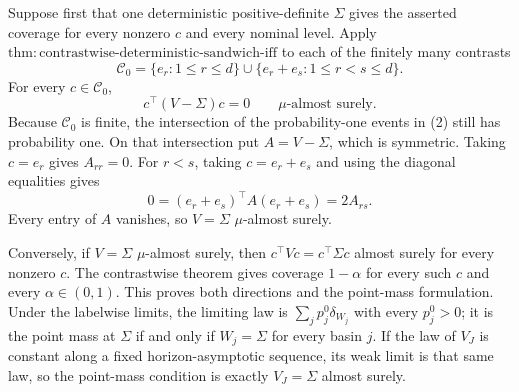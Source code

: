 Suppose first that one deterministic positive-definite \(\Sigma\) gives the asserted coverage for every nonzero \(c\) and every nominal level. Apply \(\mathrm{thm:contrastwise\text{-}deterministic\text{-}sandwich\text{-}iff}\) to each of the finitely many contrasts
\[
 \mathcal C_0=\{e_r:1\le r\le d\}\cup
 \{e_r+e_s:1\le r<s\le d\}.
\tag{1}
\]
For every \(c\in\mathcal C_0\),
\[
 c^\top(V-\Sigma)c=0\qquad\mu\text{-almost surely}.
\tag{2}
\]
Because \(\mathcal C_0\) is finite, the intersection of the probability-one events in (2) still has probability one. On that intersection put \(A=V-\Sigma\), which is symmetric. Taking \(c=e_r\) gives \(A_{rr}=0\). For \(r<s\), taking \(c=e_r+e_s\) and using the diagonal equalities gives
\[
 0=(e_r+e_s)^\top A(e_r+e_s)=2A_{rs}.
\tag{3}
\]
Every entry of \(A\) vanishes, so \(V=\Sigma\) \(\mu\)-almost surely.

Conversely, if \(V=\Sigma\) \(\mu\)-almost surely, then \(c^\top Vc=c^\top\Sigma c\) almost surely for every nonzero \(c\). The contrastwise theorem gives coverage \(1-\alpha\) for every such \(c\) and every \(\alpha\in(0,1)\). This proves both directions and the point-mass formulation. Under the labelwise limits, the limiting law is \(\sum_jp_j^0\delta_{W_j}\) with every \(p_j^0>0\); it is the point mass at \(\Sigma\) if and only if \(W_j=\Sigma\) for every basin \(j\). If the law of \(V_J\) is constant along a fixed horizon-asymptotic sequence, its weak limit is that same law, so the point-mass condition is exactly \(V_J=\Sigma\) almost surely.